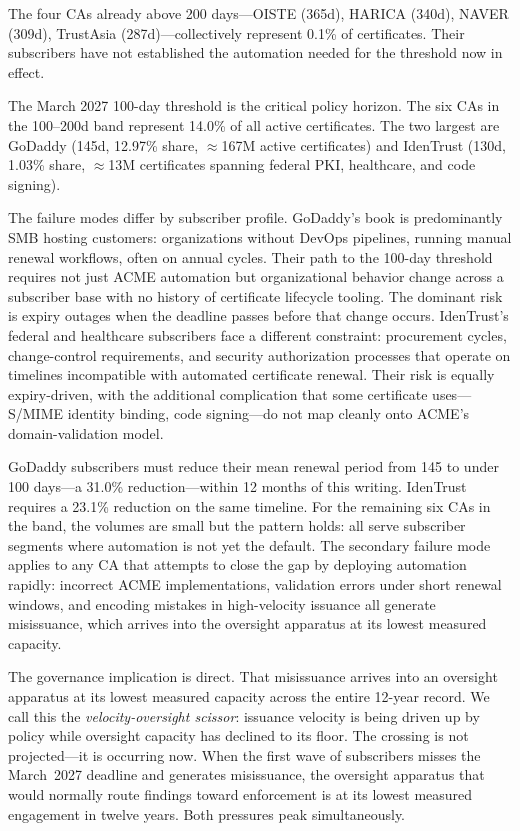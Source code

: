 \documentclass[10pt,twocolumn,letterpaper]{article}
\begin{document}
The four CAs already above 200 days---OISTE (365d), HARICA (340d), NAVER
(309d), TrustAsia (287d)---collectively represent 0.1\% of certificates.
Their subscribers have not established the automation needed for the
threshold now in effect.

The March 2027 100-day threshold is the critical policy horizon. The six
CAs in the 100--200d band represent 14.0\% of all active certificates.
The two largest are GoDaddy (145d, 12.97\% share, $\approx$167M active
certificates) and IdenTrust (130d, 1.03\% share, $\approx$13M certificates
spanning federal PKI, healthcare, and code signing).

The failure modes differ by subscriber profile. GoDaddy's book is
predominantly SMB hosting customers: organizations without DevOps
pipelines, running manual renewal workflows, often on annual cycles.
Their path to the 100-day threshold requires not just ACME automation
but organizational behavior change across a subscriber base with no
history of certificate lifecycle tooling. The dominant risk is expiry
outages when the deadline passes before that change occurs. IdenTrust's
federal and healthcare subscribers face a different constraint: procurement
cycles, change-control requirements, and security authorization processes
that operate on timelines incompatible with automated certificate renewal.
Their risk is equally expiry-driven, with the additional complication that
some certificate uses---S/MIME identity binding, code signing---do not
map cleanly onto ACME's domain-validation model.

GoDaddy subscribers must reduce their mean renewal period from 145 to
under 100 days---a 31.0\% reduction---within 12 months of this writing.
IdenTrust requires a 23.1\% reduction on the same timeline. For the
remaining six CAs in the band, the volumes are small but the pattern
holds: all serve subscriber segments where automation is not yet the
default. The secondary failure mode applies to any CA that attempts to
close the gap by deploying automation rapidly: incorrect ACME
implementations, validation errors under short renewal windows, and
encoding mistakes in high-velocity issuance all generate misissuance,
which arrives into the oversight apparatus at its lowest measured
capacity.

The governance implication is direct. That misissuance arrives into
an oversight apparatus at its lowest measured capacity across the
entire 12-year record. We call this the \textit{velocity-oversight
scissor}: issuance velocity is being driven up by policy while
oversight capacity has declined to its floor. The crossing is not
projected---it is occurring now. When the first wave of subscribers
misses the March~2027 deadline and generates misissuance, the oversight
apparatus that would normally route findings toward enforcement is at
its lowest measured engagement in twelve years. Both pressures peak
simultaneously.
\end{document}
